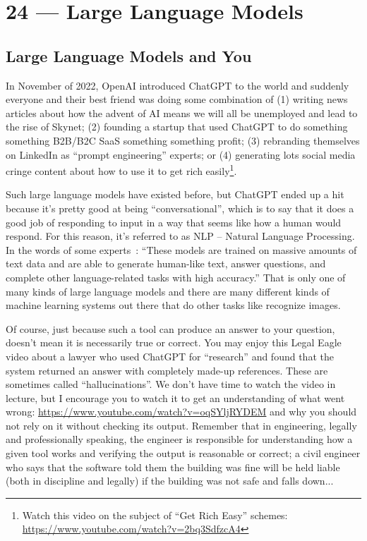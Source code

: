 \documentclass[a4paper]{report}
\begin{document}
\chapter*{24 --- Large Language Models}


\section*{Large Language Models and You}

In November of 2022, OpenAI introduced ChatGPT to the world and suddenly everyone and their best friend was doing some combination of (1) writing news articles about how the advent of AI means we will all be unemployed and lead to the rise of Skynet; (2) founding a startup that used ChatGPT to do something something B2B/B2C SaaS something something profit; (3) rebranding themselves on LinkedIn as ``prompt engineering'' experts; or (4) generating lots social media cringe content about how to use it to get rich easily\footnote{Watch this video on the subject of ``Get Rich Easy'' schemes: \url{https://www.youtube.com/watch?v=2bq3SdfzcA4}}.

Such large language models have existed before, but ChatGPT ended up a hit because it's pretty good at being ``conversational'', which is to say that it does a good job of responding to input in a way that seems like how a human would respond. For this reason, it's referred to as NLP -- Natural Language Processing. In the words of some experts~\cite{gptforgood}: ``These models are trained on massive amounts of text data and are able to generate human-like text, answer questions, and complete other language-related tasks with high accuracy.'' That is only one of many kinds of large language models and there are many different kinds of machine learning systems out there that do other tasks like recognize images.

Of course, just because such a tool can produce an answer to your question, doesn't mean it is necessarily true or correct. You may enjoy this Legal Eagle video about a lawyer who used ChatGPT for ``research'' and found that the system returned an answer with completely made-up references. These are sometimes called ``hallucinations''. We don't have time to watch the video in lecture, but I encourage you to watch it to get an understanding of what went wrong: \url{https://www.youtube.com/watch?v=oqSYljRYDEM} and why you should not rely on it without checking its output. Remember that in engineering, legally and professionally speaking, the engineer is responsible for understanding how a given tool works and verifying the output is reasonable or correct; a civil engineer who says that the software told them the building was fine will be held liable (both in discipline and legally) if the building was not safe and falls down...
\end{document}
